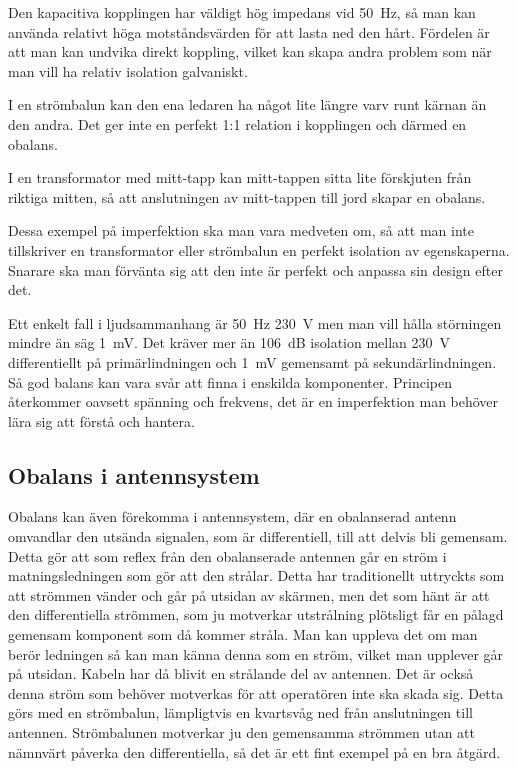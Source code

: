 Den kapacitiva kopplingen har väldigt hög impedans vid 50~Hz, så man kan
använda relativt höga motståndsvärden för att lasta ned den hårt. Fördelen är
att man kan undvika direkt koppling, vilket kan skapa andra problem som när man
vill ha relativ isolation galvaniskt.

I en strömbalun kan den ena ledaren ha något lite längre varv runt kärnan än
den andra. Det ger inte en perfekt 1:1 relation i kopplingen och därmed en
obalans.

I en transformator med mitt-tapp kan mitt-tappen sitta lite förskjuten från
riktiga mitten, så att anslutningen av mitt-tappen till jord skapar en
obalans.

Dessa exempel på imperfektion ska man vara medveten om, så att man inte
tillskriver en transformator eller strömbalun en perfekt isolation av
egenskaperna. Snarare ska man förvänta sig att den inte är perfekt och
anpassa sin design efter det.

Ett enkelt fall i ljudsammanhang är 50~Hz 230~V men man vill hålla störningen
mindre än säg 1~mV. Det kräver mer än 106~dB isolation mellan 230~V
differentiellt på primärlindningen och 1~mV gemensamt på sekundärlindningen.
Så god balans kan vara svår att finna i enskilda komponenter. Principen
återkommer oavsett spänning och frekvens, det är en imperfektion man behöver
lära sig att förstå och hantera.

\subsection{Obalans i antennsystem}

Obalans kan även förekomma i antennsystem, där en obalanserad antenn omvandlar
den utsända signalen, som är differentiell, till att delvis bli gemensam.
Detta gör att som reflex från den obalanserade antennen går en ström i
matningsledningen som gör att den strålar. Detta har traditionellt uttryckts
som att strömmen vänder och går på utsidan av skärmen, men det som hänt är att
den differentiella strömmen, som ju motverkar utstrålning plötsligt får en
pålagd gemensam komponent som då kommer stråla. Man kan uppleva det om man
berör ledningen så kan man känna denna som en ström, vilket man upplever går
på utsidan. Kabeln har då blivit en strålande del av antennen. Det är också
denna ström som behöver motverkas för att operatören inte ska skada sig.
Detta görs med en strömbalun, lämpligtvis en kvartsvåg ned från anslutningen
till antennen. Strömbalunen motverkar ju den gemensamma strömmen utan att
nämnvärt påverka den differentiella, så det är ett fint exempel på en bra
åtgärd.

